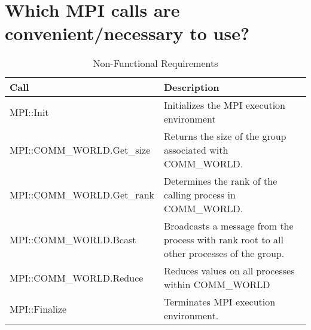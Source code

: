 \documentclass[a4paper]{article} %
\begin{document}
   \section{Which MPI calls are convenient/necessary to use?}

\begin{table}[hbt]
  \begin{center}
    \begin{tabular}{|l|p{20em}| }
      \hline
      \textbf{Call} & \textbf{Description}\\
      \hline
      MPI::Init & Initializes the MPI execution environment\\ \hline
      MPI::COMM\_WORLD.Get\_size & Returns the size of the group associated with COMM\_WORLD. \\ \hline
      MPI::COMM\_WORLD.Get\_rank & Determines the rank of the calling process in COMM\_WORLD.\\ \hline
      MPI::COMM\_WORLD.Bcast & Broadcasts a message from the process with rank root to all other processes of the group.\\ \hline
      MPI::COMM\_WORLD.Reduce & Reduces values on all processes within COMM\_WORLD\\ \hline
      MPI::Finalize & Terminates MPI execution environment. \\
      \hline
    \end{tabular}
  \end{center}
  \caption{Non-Functional Requirements}
\end{table}
   
\iffalse\begin{figure}[ht!]
\center \texttt{[image: plot.pdf]}
\end{figure}\fi
\end{document}
